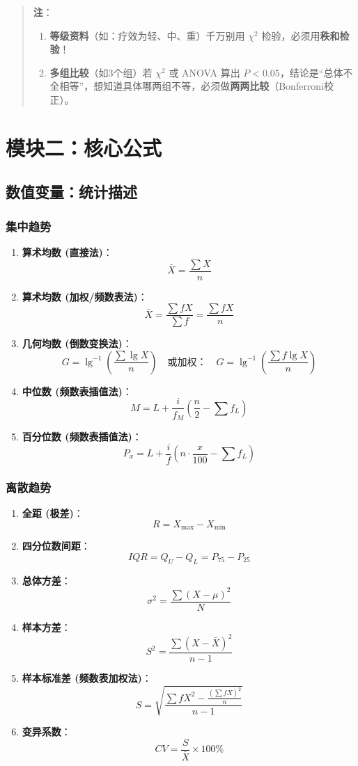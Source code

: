 \documentclass[lang=cn,10pt]{elegantbook}
\begin{document}
\begin{quote}
    \textbf{注}：
    \begin{enumerate}
        \item \textbf{等级资料}（如：疗效为轻、中、重）千万别用 $\chi^2$ 检验，必须用\textbf{秩和检验}！
        \item \textbf{多组比较}（如3个组）若 $\chi^2$ 或 ANOVA 算出 $P<0.05$，结论是“总体不全相等”，想知道具体哪两组不等，必须做\textbf{两两比较}（Bonferroni校正）。
    \end{enumerate}
\end{quote}

\section{模块二：核心公式}

\subsection{数值变量：统计描述}

\subsubsection{集中趋势}
\begin{enumerate}
    \item \textbf{算术均数 (直接法)}：
    \[ \bar{X} = \frac{\sum X}{n} \]
    \item \textbf{算术均数 (加权/频数表法)}：
    \[ \bar{X} = \frac{\sum fX}{\sum f} = \frac{\sum fX}{n} \]
    \item \textbf{几何均数 (倒数变换法)}：
    \[ G = \lg^{-1}\left(\frac{\sum \lg X}{n}\right) \quad \text{或加权：} \quad G = \lg^{-1}\left(\frac{\sum f\lg X}{n}\right) \]
    \item \textbf{中位数 (频数表插值法)}：
    \[ M = L + \frac{i}{f_M}\left(\frac{n}{2} - \sum f_L\right) \]
    \item \textbf{百分位数 (频数表插值法)}：
    \[ P_x = L + \frac{i}{f}\left(n \cdot \frac{x}{100} - \sum f_L\right) \]
\end{enumerate}

\subsubsection{离散趋势}
\begin{enumerate}
    \item \textbf{全距 (极差)}：
    \[ R = X_{\max} - X_{\min} \]
    \item \textbf{四分位数间距}：
    \[ IQR = Q_U - Q_L = P_{75} - P_{25} \]
    \item \textbf{总体方差}：
    \[ \sigma^2 = \frac{\sum (X-\mu)^2}{N} \]
    \item \textbf{样本方差}：
    \[ S^2 = \frac{\sum (X-\bar{X})^2}{n-1} \]
    \item \textbf{样本标准差 (频数表加权法)}：
    \[ S = \sqrt{\frac{\sum fX^2 - \frac{(\sum fX)^2}{n}}{n-1}} \]
    \item \textbf{变异系数}：
    \[ CV = \frac{S}{\bar{X}} \times 100\% \]
\end{enumerate}
\end{document}
